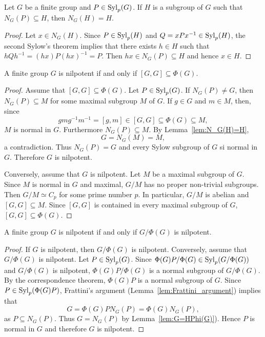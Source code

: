 \begin{lemma}
\label{lem:N_G(H)=H}
Let $G$ be a finite group and $P\in\mathrm{Syl}_p(G)$. If $H$ is a subgroup of $G$ such that
$N_G(P)\subseteq H$, then $N_G(H)=H$.
\end{lemma}

\begin{proof}
Let $x\in N_G(H)$. Since $P\in\mathrm{Syl}_p(H)$ and $Q=xPx^{-1}\in\mathrm{Syl}_p(H)$, the second Sylow's theorem 
implies that there exists 
$h\in H$ such that $hQh^{-1}=(hx)P(hx)^{-1}=P$. Then $hx\in
N_G(P)\subseteq H$ and hence $x\in H$. 
\end{proof}

\begin{theorem}[Wielandt]
\label{thm:Wielandt}
A finite group $G$ is nilpotent if and only if 
$[G,G]\subseteq\Phi(G)$.
\end{theorem}

\begin{proof}
Assume that $[G,G]\subseteq\Phi(G)$. Let $P\in\mathrm{Syl}_p(G)$. If $N_G(P)\ne
G$, then $N_G(P)\subseteq M$ for some maximal subgroup $M$ of $G$. If 
$g\in G$ and $m\in M$, then, since 
\[
	gmg^{-1}m^{-1}=[g,m]\in [G,G]\subseteq\Phi(G)\subseteq M,
\]
$M$ is normal in $G$. Furthermore $N_G(P)\subseteq M$. 
By Lemma~\ref{lem:N_G(H)=H},
\[
G=N_G(M)=M,
\]
a contradiction.
Thus $N_G(P)=G$ and every Sylow subgroup of $G$ si normal in $G$. Therefore 
$G$ is nilpotent. 

Conversely, assume that $G$ is nilpotent. Let $M$ be a maximal subgroup of $G$.
Since $M$ is normal in $G$ and maximal, $G/M$ has no proper non-trivial subgroups. 
Then $G/M\simeq C_p$ for some prime number $p$. In particular, $G/M$ is abelian
and $[G,G]\subseteq M$. Since $[G,G]$ is contained in every maximal subgroup of $G$, 
$[G,G]\subseteq\Phi(G)$.
\end{proof}

\begin{theorem}
\label{the:G/phi(G)}
A finite group $G$ is nilpotent if and only if 
$G/\Phi(G)$ is nilpotent. 
\end{theorem}

\begin{proof}
If $G$ is nilpotent, then $G/\Phi(G)$ is nilpotent. Conversely, assume that 
$G/\Phi(G)$ is nilpotent. Let $P\in\mathrm{Syl}_p(G)$. Since 
$\Phi(G)P/\Phi(G)\in\mathrm{Syl}_p(G/\Phi(G))$ and $G/\Phi(G)$ is nilpotent,
$\Phi(G)P/\Phi(G)$ is a normal subgroup of $G/\Phi(G)$. By the correspondence theorem, 
$\Phi(G)P$ is a normal subgroup of $G$.
Since $P\in\mathrm{Syl}_p(\Phi(G)P)$, Frattini's argument 
(Lemma~\ref{lem:Frattini_argument}) implies that 
\[
G=\Phi(G)PN_G(P)=\Phi(G)N_G(P), 
\]
as $P\subseteq N_G(P)$. Thus $G=N_G(P)$ by Lemma~\ref{lem:G=HPhi(G)}). Hence 
$P$ is normal in $G$ and therefore $G$ is nilpotent. 
\end{proof}

